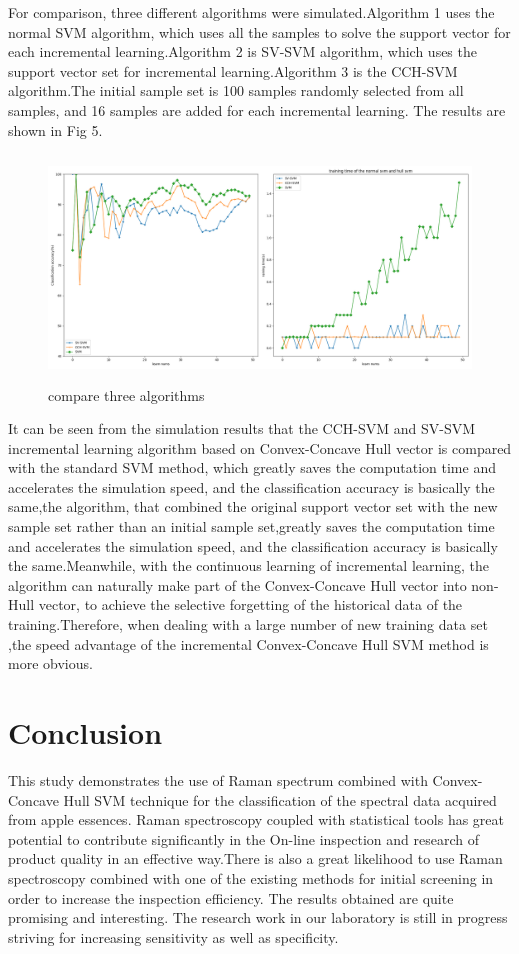 \documentclass[a4paper]{article}
\begin{document}
For comparison, three different algorithms were simulated.Algorithm 1 uses the normal SVM algorithm, which uses all the samples to solve the support vector for each incremental learning.Algorithm 2 is SV-SVM algorithm, which uses the support vector set for incremental learning.Algorithm 3 is the CCH-SVM algorithm.The initial sample set is 100 samples randomly selected from all samples, and 16 samples are added for each incremental learning. The results are shown in Fig 5.

\begin{figure}[h]
  \centering
  \includegraphics[width=15cm,height=6cm]{Figure_2}
  \caption{compare three algorithms}
\end{figure}

It can be seen from the simulation results that the CCH-SVM and SV-SVM incremental learning algorithm based on Convex-Concave Hull vector is compared with the standard SVM method, which greatly saves the computation time and accelerates the simulation speed, and the classification accuracy is basically the same,the algorithm, that combined the original support vector set with the new sample set rather than an initial sample set,greatly saves the computation time and accelerates the simulation speed, and the classification accuracy is basically the same.Meanwhile, with the continuous learning of incremental learning, the algorithm can naturally make part of the Convex-Concave Hull vector into non-Hull vector, to achieve the selective forgetting of the historical data of the training.Therefore, when dealing with a large number of new training data set ,the speed advantage of the incremental Convex-Concave Hull SVM method is more obvious.

\section{Conclusion}
This  study  demonstrates  the  use  of  Raman  spectrum  combined  with Convex-Concave Hull SVM  technique  for the  classification  of  the  spectral  data  acquired  from  apple essences. Raman  spectroscopy  coupled  with  statistical  tools  has  great  potential  to  contribute significantly in the On-line inspection and research of product quality in an effective way.There is also a great  likelihood  to  use  Raman  spectroscopy  combined  with  one  of  the  existing  methods  for initial screening in order to increase the inspection efficiency. The results obtained are quite promising and interesting. The research work in our laboratory is still in progress striving for increasing sensitivity as well as specificity.
\end{document}
